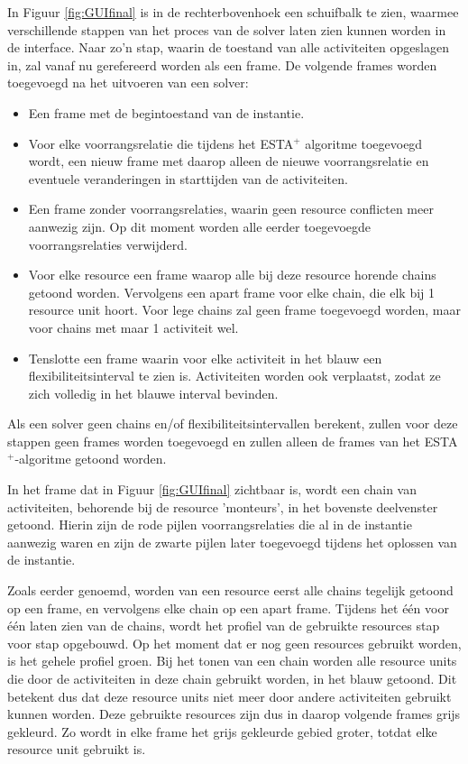 In Figuur \ref{fig:GUIfinal} is in de rechterbovenhoek een schuifbalk te zien, waarmee verschillende stappen van het proces van de solver laten zien kunnen worden in de interface. Naar zo'n stap, waarin de toestand van alle activiteiten opgeslagen in, zal vanaf nu gerefereerd worden als een frame. De volgende frames worden toegevoegd na het uitvoeren van een solver:
\begin{itemize}
\item Een frame met de begintoestand van de instantie.
\item Voor elke voorrangsrelatie die tijdens het ESTA$^+$ algoritme toegevoegd wordt, een nieuw frame met daarop alleen de nieuwe voorrangsrelatie en eventuele veranderingen in starttijden van de activiteiten.
\item Een frame zonder voorrangsrelaties, waarin geen resource conflicten meer aanwezig zijn. Op dit moment worden alle eerder toegevoegde voorrangsrelaties verwijderd.
\item Voor elke resource een frame waarop alle bij deze resource horende chains getoond worden. Vervolgens een apart frame voor elke chain, die elk bij 1 resource unit hoort. Voor lege chains zal geen frame toegevoegd worden, maar voor chains met maar 1 activiteit wel.
\item Tenslotte een frame waarin voor elke activiteit in het blauw een flexibiliteitsinterval te zien is. Activiteiten worden ook verplaatst, zodat ze zich volledig in het blauwe interval bevinden.
\end{itemize}
Als een solver geen chains en/of flexibiliteitsintervallen berekent, zullen voor deze stappen geen frames worden toegevoegd en zullen alleen de frames van het ESTA$^+$-algoritme getoond worden.

In het frame dat in Figuur \ref{fig:GUIfinal} zichtbaar is, wordt een chain van activiteiten, behorende bij de resource 'monteurs', in het bovenste deelvenster getoond. Hierin zijn de rode pijlen voorrangsrelaties die al in de instantie aanwezig waren en zijn de zwarte pijlen later toegevoegd tijdens het oplossen van de instantie.

Zoals eerder genoemd, worden van een resource eerst alle chains tegelijk getoond op een frame, en vervolgens elke chain op een apart frame. Tijdens het \'e\'en voor \'e\'en laten zien van de chains, wordt  het profiel van de gebruikte resources stap voor stap opgebouwd. Op het moment dat er nog geen resources gebruikt worden, is het gehele profiel groen. Bij het tonen van een chain worden alle resource units die door de activiteiten in deze chain gebruikt worden, in het blauw getoond. Dit betekent dus dat deze resource units niet meer door andere activiteiten gebruikt kunnen worden. Deze gebruikte resources zijn dus in daarop volgende frames grijs gekleurd. Zo wordt in elke frame het grijs gekleurde gebied groter, totdat elke resource unit gebruikt is.


